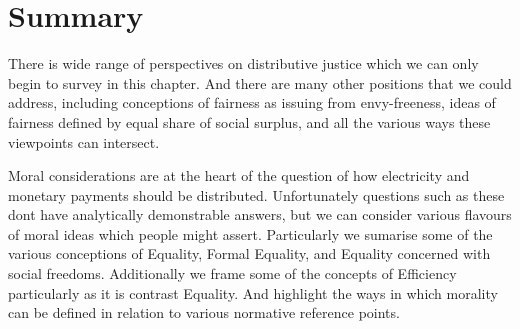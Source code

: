 

\section{Summary}

There is wide range of perspectives on distributive justice which we can only begin to survey in this chapter.
And there are many other positions that we could address, including conceptions of fairness as issuing from envy-freeness, ideas of fairness defined by equal share of social surplus, and all the various ways these viewpoints can intersect.%

Moral considerations are at the heart of the question of how electricity and monetary payments should be distributed.
Unfortunately questions such as these dont have analytically demonstrable answers, but we can consider various flavours of moral ideas which people might assert.
Particularly we sumarise some of the various conceptions of Equality, Formal Equality, and Equality concerned with social freedoms.
Additionally we frame some of the concepts of Efficiency particularly as it is contrast Equality.
And highlight the ways in which morality can be defined in relation to various normative reference points.

